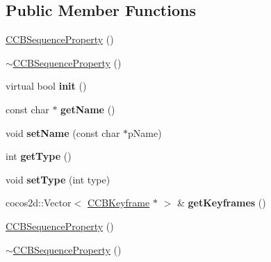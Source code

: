 \subsection*{Public Member Functions}
\begin{DoxyCompactItemize}
\item 
\hyperlink{classcocosbuilder_1_1CCBSequenceProperty_adef6c18a9d0ba1842c84861e5562e11c}{C\+C\+B\+Sequence\+Property} ()
\item 
\hyperlink{classcocosbuilder_1_1CCBSequenceProperty_a5425e512c229c867c41ea353088fa6cb}{$\sim$\+C\+C\+B\+Sequence\+Property} ()
\item 
\mbox{\label{classcocosbuilder_1_1CCBSequenceProperty_a2ae9cbfd4f7c1b5867ccb10dc0e6d39c}} 
virtual bool {\bfseries init} ()
\item 
\mbox{\label{classcocosbuilder_1_1CCBSequenceProperty_a9fb2b51917ee85f4509613631866c210}} 
const char $\ast$ {\bfseries get\+Name} ()
\item 
\mbox{\label{classcocosbuilder_1_1CCBSequenceProperty_ad3b7d2aeac32c07c117babd19ab98b99}} 
void {\bfseries set\+Name} (const char $\ast$p\+Name)
\item 
\mbox{\label{classcocosbuilder_1_1CCBSequenceProperty_a6b059f06960d9884cedd82af7688395f}} 
int {\bfseries get\+Type} ()
\item 
\mbox{\label{classcocosbuilder_1_1CCBSequenceProperty_a6388ff214d6719f3882f822fec102ae7}} 
void {\bfseries set\+Type} (int type)
\item 
\mbox{\label{classcocosbuilder_1_1CCBSequenceProperty_aea782023bea14d5ee4143898cd5f3729}} 
cocos2d\+::\+Vector$<$ \hyperlink{classcocosbuilder_1_1CCBKeyframe}{C\+C\+B\+Keyframe} $\ast$ $>$ \& {\bfseries get\+Keyframes} ()
\item 
\hyperlink{classcocosbuilder_1_1CCBSequenceProperty_adef6c18a9d0ba1842c84861e5562e11c}{C\+C\+B\+Sequence\+Property} ()
\item 
\hyperlink{classcocosbuilder_1_1CCBSequenceProperty_a5425e512c229c867c41ea353088fa6cb}{$\sim$\+C\+C\+B\+Sequence\+Property} ()

\end{DoxyCompactItemize}
